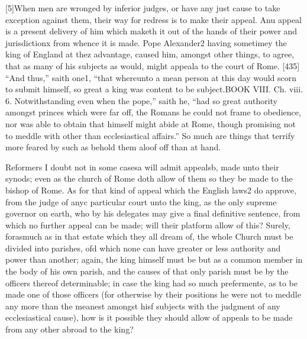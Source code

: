 [5]When men are wronged by inferior judges, or have any just cause to take exception against them, their way for redress is to make their appeal. Anu appeal is a present delivery of him which maketh it out of the hands of their power and jurisdictionx from whence it is made. Pope Alexander2 having sometimey the king of England at thez advantage, caused him, amongst other things, to agree, that as many of his subjects as would, might appeala to the court of Rome. [435] “And thus,” saith one1, “that whereunto a mean person at this day would scorn to submit himself, so great a king was content to be subject.BOOK VIII. Ch. viii. 6. Notwithstanding even when the pope,” saith he, “had so great authority amongst princes which were far off, the Romans he could not frame to obedience, nor was able to obtain that himself might abide at Rome, though promising not to meddle with other than ecclesiastical affairs.” So much are things that terrify more feared by such as behold them aloof off than at hand.

Reformers I doubt not in some casesa will admit appealsb, made unto their synods; even as the church of Rome doth allow of them so they be made to the bishop of Rome. As for that kind of appeal which the English laws2 do approve, from the judge of anyc particular court unto the king, as the only supreme governor on earth, who by his delegates may give a final definitive sentence, from which no further appeal can be made; will their platform allow of this? Surely, forasmuch as in that estate which they all dream of, the whole Church must be divided into parishes, ofd which none can have greater or less authority and power than another; again, the king himself must be but as a common member in the body of his own parish, and the causes of that only parish must be by the officers thereof determinable; in case the king had so much prefermente, as to be made one of those officers (for otherwise by their positions he were not to meddle any more than the meanest amongst hisf subjects with the judgment of any ecclesiastical cause), how is it possible they should allow of appeals to be made from any other abroad to the king?

